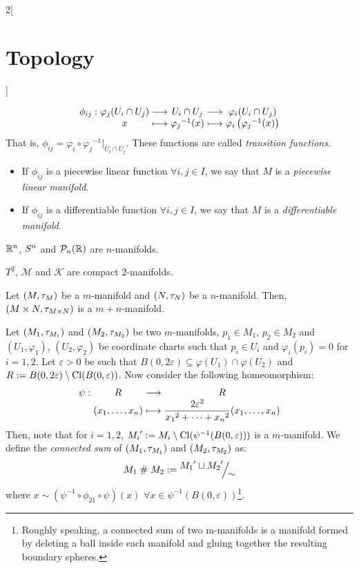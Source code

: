 \documentclass[../../../main_math.tex]{subfiles}
\begin{document}
\begin{multicols}{2}[\section{Topology}]
\begin{definition}
$$      \begin{array}{r@{\hspace{0.5\tabcolsep}}c@{\hspace{0.5\tabcolsep}}c@{\hspace{0.5\tabcolsep}}c@{\hspace{0.5\tabcolsep}}c@{\hspace{0.5\tabcolsep}}c}
        \phi_{ij}: & \varphi_j(U_i\cap U_j) & \longrightarrow & U_i\cap U_j         & \longrightarrow & \varphi_i(U_i\cap U_j)                    \\
                   & x                      & \longmapsto     & {\varphi_j}^{-1}(x) & \longmapsto     & \varphi_i\left({\varphi_j}^{-1}(x)\right)
      \end{array}$$
    That is, $\phi_{ij}=\varphi_i\circ{\varphi_j}^{-1}|_{U_i\cap U_j}$. These functions are called \emph{transition functions}.
    \begin{itemize}
      \item If $\phi_{ij}$ is a piecewise linear function $\forall i,j\in I$, we say that $M$ is a \emph{piecewise linear manifold}.
      \item If $\phi_{ij}$ is a differentiable function $\forall i,j\in I$, we say that $M$ is a \emph{differentiable manifold}.
    \end{itemize}
  \end{definition}
  \begin{proposition}
    $\RR^n$, $\S^n$ and $\mathcal{P}_n(\RR)$ are $n$-manifolds.
  \end{proposition}
  \begin{proposition}
    $T^2$, $\mathcal{M}$ and $\mathcal{K}$ are compact $2$-manifolds.
  \end{proposition}
  \begin{proposition}
    Let $(M,\topo_M)$ be a $m$-manifold and $(N,\topo_N)$ be a $n$-manifold. Then, $(M\times N,\topo_{M\times N})$ is a $m+n$-manifold.
  \end{proposition}
  \begin{definition}
    Let $(M_1,\topo_{M_1})$ and $(M_2,\topo_{M_2})$ be two $m$-manifolds, $p_1\in M_1$, $p_2\in M_2$ and $(U_1,\varphi_1)$, $(U_2,\varphi_2)$ be coordinate charts such that $p_i\in U_i$ and $\varphi_i(p_i)=0$ for $i=1,2$. Let $\varepsilon>0$ be such that $B(0,2\varepsilon)\subseteq \varphi(U_1)\cap \varphi(U_2)$ and $R:=B(0,2\varepsilon)\setminus\Cl (B(0,\varepsilon))$. Now consider the following homeomorphism:
    $$\function{\psi}{R}{R}{(x_1,\ldots,x_n)}{\displaystyle\frac{2\varepsilon^2}{{x_1}^2+\cdots+{x_n}^2}(x_1,\ldots,x_n)}$$
    Then, note that for $i=1,2$, ${M_i}':=M_i\setminus\Cl(\psi^{-1}(B(0,\varepsilon)))$ is a $m$-manifold. We define the \emph{connected sum} of $(M_1,\topo_{M_1})$ and $(M_2,\topo_{M_2})$ as: $$M_1\conn M_2:=\quot{{M_1}'\sqcup{M_2}'}{\sim}$$
    where $x\sim (\psi^{-1}\circ\phi_{21}\circ\psi)(x)$ $\forall x\in \psi^{-1}(B(0,\varepsilon))$\footnote{Roughly speaking, a connected sum of two m-manifolds is a manifold formed by deleting a ball inside each manifold and gluing together the resulting boundary spheres.}.
  \end{definition}

\end{multicols}
\end{document}
